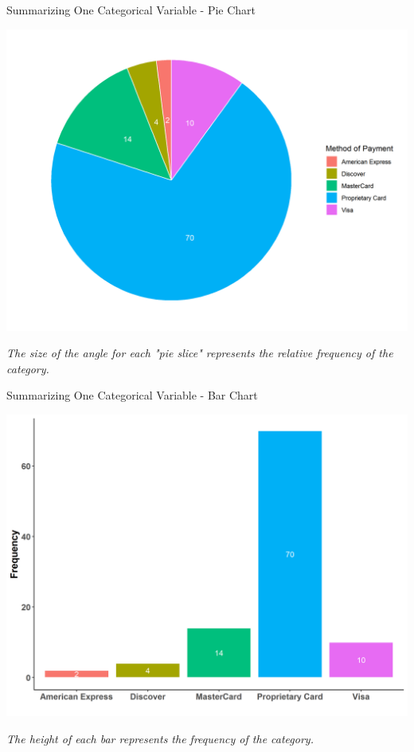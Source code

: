 \documentclass{beamer}
\begin{document}
\begin{frame}{Summarizing One Categorical Variable - Pie Chart}

\begin{center}
\includegraphics[scale=.45]{images/ch2PieChart.png}

\textit{The size of the angle for each "pie slice" represents the relative frequency of the category. 
}
\end{center}
\end{frame}


\begin{frame}{Summarizing One Categorical Variable - Bar Chart}

\begin{center}
\includegraphics[scale=.45]{images/ch2BarChart.png}

\textit{The height of each bar represents the frequency of the category. 
}
\end{center}


\end{frame}
\end{document}

